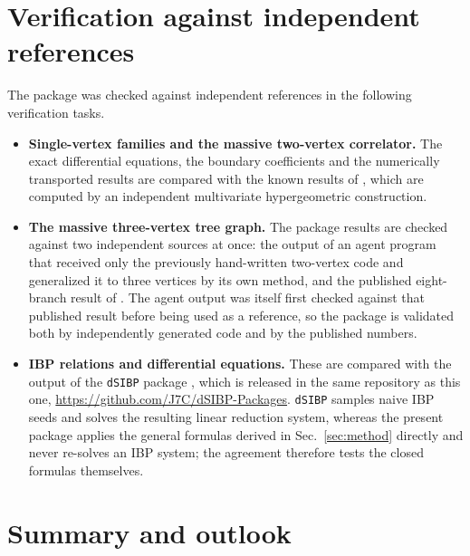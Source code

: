 \documentclass[11pt,a4paper]{article}
\begin{document}
\section{Verification against independent references}
\label{sec:verification}

The package was checked against independent references in the following verification tasks.

\begin{itemize}
  \item \textbf{Single-vertex families and the massive two-vertex correlator.} The exact
        differential equations, the boundary coefficients and the numerically transported results
        are compared with the known results of \cite{Chen:2024glu}, which are computed by an
        independent multivariate hypergeometric construction.
  \item \textbf{The massive three-vertex tree graph.} The package results are checked against two
        independent sources at once: the output of an agent program that received only the
        previously hand-written two-vertex code and generalized it to three vertices by its own
        method, and the published eight-branch result of \cite{Xianyu:2023ytd}. The agent output was
        itself first checked against that published result before being used as a reference, so the
        package is validated both by independently generated code and by the published numbers.
  \item \textbf{IBP relations and differential equations.} These are compared with the output of the
        \texttt{dSIBP} package \cite{dSIBP:inPreparation}, which is released in the same repository
        as this one, \url{https://github.com/J7C/dSIBP-Packages}. \texttt{dSIBP} samples naive IBP
        seeds and solves the resulting linear reduction system, whereas the present package applies
        the general formulas derived in Sec.~\ref{sec:method} directly and never re-solves an IBP
        system; the agreement therefore tests the closed formulas themselves.
\end{itemize}

\section{Summary and outlook}
\label{sec:summary}
\end{document}
